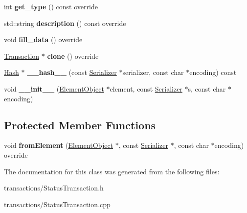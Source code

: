 \begin{DoxyCompactItemize}
int {\bfseries get\+\_\+type} () const override
\item 
\mbox{\label{classStatusTransaction_a1f6c6fd3f04ba1483028aee23bd862da}} 
std\+::string {\bfseries description} () const override
\item 
\mbox{\label{classStatusTransaction_a5abd3cf04705bd7cd3f37b628dcf21a4}} 
void {\bfseries fill\+\_\+data} () override
\item 
\mbox{\label{classStatusTransaction_ac920c5dfe6f75a650e74b92899310400}} 
\mbox{\hyperlink{classTransaction}{Transaction}} $\ast$ {\bfseries clone} () override
\item 
\mbox{\label{classTransaction_a1f0df166c34d6a38a991544cf98c0356}} 
\mbox{\hyperlink{classHash}{Hash}} $\ast$ {\bfseries \+\_\+\+\_\+hash\+\_\+\+\_\+} (const \mbox{\hyperlink{classSerializer}{Serializer}} $\ast$serializer, const char $\ast$encoding) const
\item 
\mbox{\label{classComponent_a28212595f8ee85fe009bd233bc99b2fc}} 
void {\bfseries \+\_\+\+\_\+init\+\_\+\+\_\+} (\mbox{\hyperlink{classElementObject}{Element\+Object}} $\ast$element, const \mbox{\hyperlink{classSerializer}{Serializer}} $\ast$s, const char $\ast$encoding)
\end{DoxyCompactItemize}
\subsection*{Protected Member Functions}
\begin{DoxyCompactItemize}
\item 
\mbox{\label{classStatusTransaction_aa05e4be5f990e8a9533383b3b7dc1382}} 
void {\bfseries from\+Element} (\mbox{\hyperlink{classElementObject}{Element\+Object}} $\ast$, const \mbox{\hyperlink{classSerializer}{Serializer}} $\ast$, const char $\ast$encoding) override
\end{DoxyCompactItemize}


The documentation for this class was generated from the following files\+:\begin{DoxyCompactItemize}
\item 
transactions/Status\+Transaction.\+h\item 
transactions/Status\+Transaction.\+cpp\end{DoxyCompactItemize}
